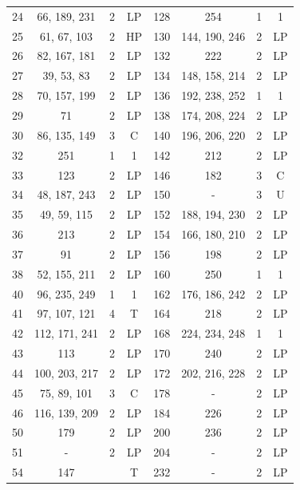 \begin{table}
\begin{tabular}{c|c|c|c||c|c|c|c}
        24 & 66, 189, 231 & 2 & LP &     128 & 254 & 1 & 1 \\
        25 & 61, 67, 103 & 2 & HP &      130 & 144, 190, 246 & 2 & LP \\
        26 & 82, 167, 181 & 2 & LP &     132 & 222 & 2 & LP \\
        27 & 39, 53, 83 & 2 & LP &       134 & 148, 158, 214 & 2 & LP \\
        28 & 70, 157, 199 & 2 & LP &     136 & 192, 238, 252 & 1 & 1 \\
        29 & 71 & 2 & LP &               138 & 174, 208, 224 & 2 & LP \\
        30 & 86, 135, 149 & 3 & C &      140 & 196, 206, 220 & 2 & LP \\
        32 & 251 & 1 & 1 &               142 & 212 & 2 & LP \\
        33 & 123 & 2 & LP &              146 & 182 & 3 & C \\
        34 & 48, 187, 243 & 2 & LP &     150 & - & 3 & U \\
        35 & 49, 59, 115 & 2 & LP &      152 & 188, 194, 230 & 2 & LP \\
        36 & 213 & 2 & LP &              154 & 166, 180, 210 & 2 & LP \\
        37 & 91 & 2 & LP &               156 & 198 & 2 & LP \\
        38 & 52, 155, 211 & 2 & LP &     160 & 250 & 1 & 1 \\
        40 & 96, 235, 249 & 1 & 1 &      162 & 176, 186, 242 & 2 & LP \\
        41 & 97, 107, 121 & 4 & T &      164 & 218 & 2 & LP \\
        42 & 112, 171, 241 & 2 & LP &    168 & 224, 234, 248 & 1 & 1 \\
        43 & 113 & 2 & LP &              170 & 240 & 2 & LP \\
        44 & 100, 203, 217 & 2 & LP &    172 & 202, 216, 228 & 2 & LP \\
        45 & 75, 89, 101 & 3 & C &       178 & - & 2 & LP \\
        46 & 116, 139, 209 & 2 & LP &    184 & 226 & 2 & LP \\
        50 & 179 & 2 & LP &              200 & 236 & 2 & LP \\
        51 & - & 2 & LP &                204 & - & 2 & LP \\
        54 & 147 & & T &                 232 & - & 2 & LP \\
    \end{tabular}
\end{table}








